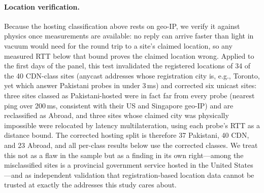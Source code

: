 \documentclass[sigconf,anonymous,10pt]{acmart}
\begin{document}
\paragraph{Location verification.}
Because the hosting classification above rests on geo-IP, we verify it against physics once
measurements are available: no reply can arrive faster than light in vacuum would need for the
round trip to a site's claimed location, so any measured RTT below that bound proves the claimed
location wrong. Applied to the first days of the panel, this test invalidated the registered
locations of 34 of the 40 CDN-class sites (anycast addresses whose registration city is, e.g.,
Toronto, yet which answer Pakistani probes in under 3\,ms) and corrected six unicast sites: three
sites classed as Pakistani-hosted were in fact far from every probe (nearest ping over 200\,ms,
consistent with their US and Singapore geo-IP) and are reclassified as Abroad, and three sites
whose claimed city was physically impossible were relocated by latency multilateration, using each
probe's RTT as a distance bound. The corrected hosting split is therefore 37 Pakistani, 40 CDN,
and 23 Abroad, and all per-class results below use the corrected classes. We treat this not as a
flaw in the sample but as a finding in its own right---among the misclassified sites is a
provincial government service hosted in the United States---and as independent validation that
registration-based location data cannot be trusted at exactly the addresses this study cares
about.
\end{document}

